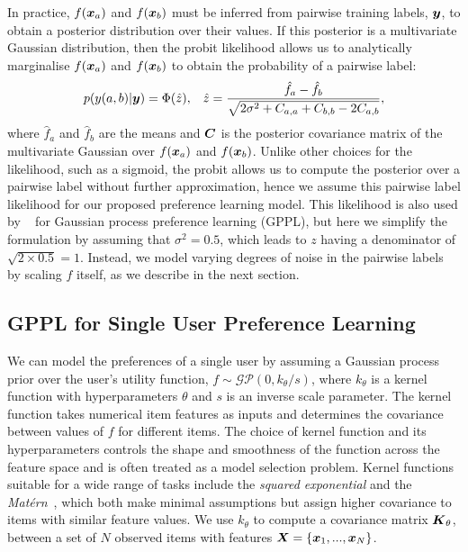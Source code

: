 In practice, $f(\boldsymbol x_a)$ and $f(\boldsymbol x_b)$ must be inferred from
pairwise training labels, $\boldsymbol y$,
to obtain a posterior distribution over their values.
If this posterior is a multivariate Gaussian distribution,
then the probit likelihood allows us to analytically marginalise 
$f(\boldsymbol x_a)$ and $f(\boldsymbol x_b)$
to obtain the probability of a pairwise label:
\begin{align}
p(y(a,b)| \boldsymbol y) 
= \Phi(\hat{z}),& & \hat{z} = \frac{\hat{f}_a - \hat{f}_b}{\sqrt{2\sigma^2 + C_{a,a} + C_{b,b} 
- 2C_{a,b}} }, \label{eq:predict_z}
\end{align}
where $\hat{f}_a$ and $\hat{f}_b$ are the means and
$\boldsymbol C$ is the posterior covariance matrix of the multivariate Gaussian over
$f(\boldsymbol x_a)$ and $f(\boldsymbol x_b)$.
Unlike other choices for the likelihood, such as a sigmoid,
the probit allows us to compute the posterior over a pairwise label
without further approximation, %
hence we assume this pairwise label likelihood for our proposed preference learning model.
This likelihood is also used by
~\citet{chu2005preference} for Gaussian process preference learning (GPPL), but here 
we simplify the formulation by assuming that $\sigma^2 = 0.5$,
which leads to $z$ having a denominator of $\sqrt{2 \times 0.5}=1$.
Instead, we model varying degrees of noise in the pairwise labels
by scaling $f$ itself, as we describe in the next section.


\subsection{GPPL for Single User Preference Learning}

We can model the preferences of a single user by assuming
a Gaussian process prior over the user's utility function, 
$f \sim \mathcal{GP}(0, k_{\theta}/s)$, where $k_{\theta}$ is a kernel function with hyperparameters $\theta$
and $s$ is an inverse scale parameter.
The kernel function takes numerical item features as inputs and determines the covariance between values of $f$ for different items. 
The choice of kernel function and its hyperparameters controls the shape and smoothness of the function 
across the feature space and is often treated as a model selection problem.
Kernel functions suitable for a wide range of tasks include the \emph{squared exponential} 
and the \emph{Mat\'ern}~\citep{rasmussen_gaussian_2006},
which both make minimal assumptions but 
assign higher covariance to items with similar feature values.
We use $k_{\theta}$ to compute a covariance matrix $\boldsymbol K_{\theta}$,
between a set of $N$ observed items with features $\boldsymbol X = \{ \boldsymbol x_1, ..., \boldsymbol x_N \}$.

